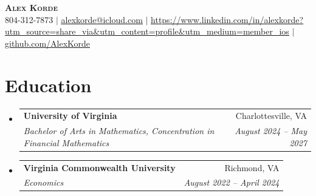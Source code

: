 \documentclass[letterpaper,11pt]{article}
\makeatletter
\newcommand{\resumeSubheading}[4]{
  \vspace{-2pt}\item
    \begin{tabular*}{0.97\textwidth}[t]{l@{\extracolsep{\fill}}r}
      \textbf{#1} & #2 \\
      \textit{\small#3} & \textit{\small #4} \\
    \end{tabular*}\vspace{-7pt}
}
\newcommand{\resumeSubHeadingListStart}{\begin{itemize}[leftmargin=0.15in, label={}]}
\newcommand{\resumeSubHeadingListEnd}{\end{itemize}}
\makeatother
\begin{document}

\begin{center}
    \textbf{\Huge \scshape Alex Korde} \\ \vspace{1pt}
    \small 804-312-7873 $|$ \href{mailto:x@x.com}{\underline{alexkorde@icloud.com}} $|$ 
    \href{https://linkedin.com/in/...}{\underline{https://www.linkedin.com/in/alexkorde?utm_source=share_via&utm_content=profile&utm_medium=member_ios}} $|$
    \href{https://github.com/...}{\underline{github.com/AlexKorde}}
\end{center}

\section{Education}
  \resumeSubHeadingListStart
    \resumeSubheading
      {University of Virginia}{Charlottesville, VA}
      {Bachelor of Arts in Mathematics, Concentration in Financial Mathematics}{August 2024 -- May 2027}
      \resumeSubheading
      {Virginia Commonwealth University}{Richmond, VA}
      {Economics}{August 2022 -- April 2024}
    
  \resumeSubHeadingListEnd
   
\end{document}

